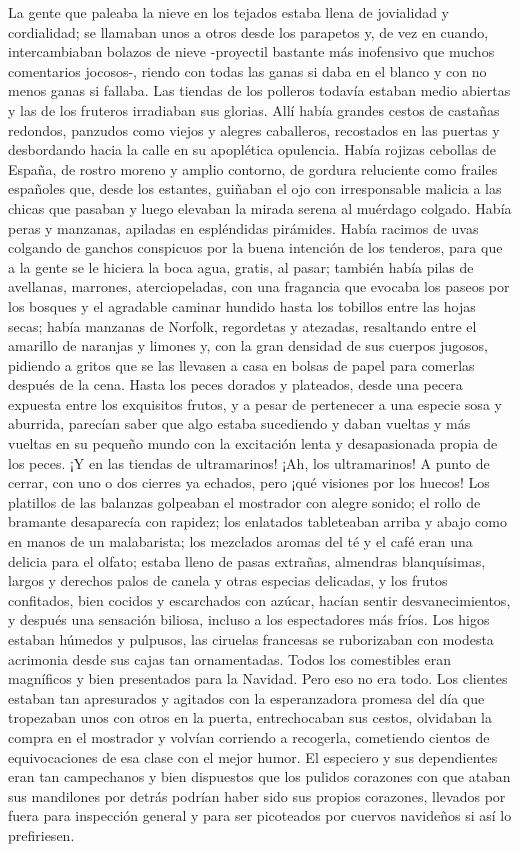 \documentclass{novela}
\begin{document}
 La gente que paleaba la nieve en los tejados estaba llena de jovialidad y cordialidad; se llamaban unos a otros desde los parapetos y, de vez en cuando, intercambiaban bolazos de nieve -proyectil bastante más inofensivo que muchos comentarios jocosos-, riendo con todas las ganas si daba en el blanco y con no menos ganas si fallaba. Las tiendas de los polleros todavía estaban medio abiertas y las de los fruteros irradiaban sus glorias. Allí había grandes cestos de castañas redondos, panzudos como viejos y alegres caballeros, recostados en las puertas y desbordando hacia la calle en su apoplética opulencia. Había rojizas cebollas de España, de rostro moreno y amplio contorno, de gordura reluciente como frailes españoles que, desde los estantes, guiñaban el ojo con irresponsable malicia a las chicas que pasaban y luego elevaban la mirada serena al muérdago colgado. Había peras y manzanas, apiladas en espléndidas pirámides. Había racimos de uvas colgando de ganchos conspicuos por la buena intención de los tenderos, para que a la gente se le hiciera la boca agua, gratis, al pasar; también había pilas de avellanas, marrones, aterciopeladas, con una fragancia que evocaba los paseos por los bosques y el agradable caminar hundido hasta los tobillos entre las hojas secas; había manzanas de Norfolk, regordetas y atezadas, resaltando entre el amarillo de naranjas y limones y, con la gran densidad de sus cuerpos jugosos, pidiendo a gritos que se las llevasen a casa en bolsas de papel para comerlas después de la cena. Hasta los peces dorados y plateados, desde una pecera expuesta entre los exquisitos frutos, y a pesar de pertenecer a una especie sosa y aburrida, parecían saber que algo estaba sucediendo y daban vueltas y más vueltas en su pequeño mundo con la excitación lenta y desapasionada propia de los peces. ¡Y en las tiendas de ultramarinos! ¡Ah, los ultramarinos! A punto de cerrar, con uno o dos cierres ya echados, pero ¡qué visiones por los huecos! Los platillos de las balanzas golpeaban el mostrador con alegre sonido; el rollo de bramante desaparecía con rapidez; los enlatados tableteaban arriba y abajo como en manos de un malabarista; los mezclados aromas del té y el café eran una delicia para el olfato; estaba lleno de pasas extrañas, almendras blanquísimas, largos y derechos palos de canela y otras especias delicadas, y los frutos confitados, bien cocidos y escarchados con azúcar, hacían sentir desvanecimientos, y después una sensación biliosa, incluso a los espectadores más fríos. Los higos estaban húmedos y pulpusos, las ciruelas francesas se ruborizaban con modesta acrimonia desde sus cajas tan ornamentadas. Todos los comestibles eran magníficos y bien presentados para la Navidad. Pero eso no era todo. Los clientes estaban tan apresurados y agitados con la esperanzadora promesa del día que tropezaban unos con otros en la puerta, entrechocaban sus cestos, olvidaban la compra en el mostrador y volvían corriendo a recogerla, cometiendo cientos de equivocaciones de esa clase con el mejor humor. El especiero y sus dependientes eran tan campechanos y bien dispuestos que los pulidos corazones con que ataban sus mandilones por detrás podrían haber sido sus propios corazones, llevados por fuera para inspección general y para ser picoteados por cuervos navideños si así lo prefiriesen.
\end{document}
